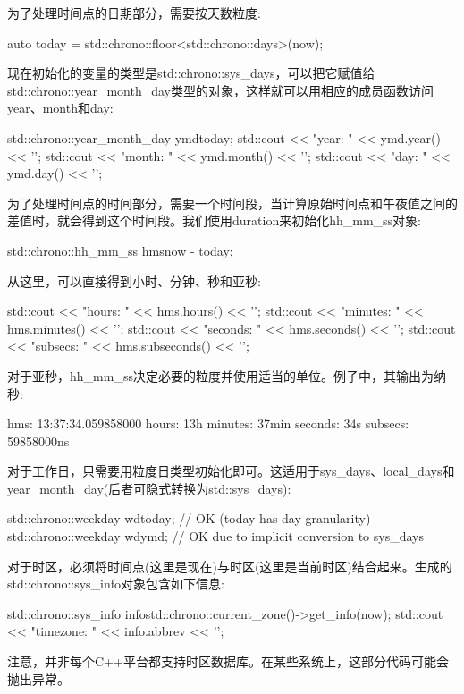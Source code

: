 为了处理时间点的日期部分，需要按天数粒度:

\begin{cpp}
auto today = std::chrono::floor<std::chrono::days>(now);
\end{cpp}

现在初始化的变量的类型是std::chrono::sys\_days，可以把它赋值给std::chrono::year\_month\_day类型的对象，这样就可以用相应的成员函数访问year、month和day:

\begin{cpp}
std::chrono::year_month_day ymd{today};
std::cout << "year: " << ymd.year() << '\n';
std::cout << "month: " << ymd.month() << '\n';
std::cout << "day: " << ymd.day() << '\n';
\end{cpp}

为了处理时间点的时间部分，需要一个时间段，当计算原始时间点和午夜值之间的差值时，就会得到这个时间段。我们使用duration来初始化hh\_mm\_ss对象:

\begin{cpp}
std::chrono::hh_mm_ss hms{now - today};
\end{cpp}

从这里，可以直接得到小时、分钟、秒和亚秒:

\begin{cpp}
std::cout << "hours: " << hms.hours() << '\n';
std::cout << "minutes: " << hms.minutes() << '\n';
std::cout << "seconds: " << hms.seconds() << '\n';
std::cout << "subsecs: " << hms.subseconds() << '\n';
\end{cpp}

对于亚秒，hh\_mm\_ss决定必要的粒度并使用适当的单位。例子中，其输出为纳秒:

\begin{shell}
hms:      13:37:34.059858000
hours:    13h
minutes:  37min
seconds:  34s
subsecs:  59858000ns
\end{shell}

对于工作日，只需要用粒度日类型初始化即可。这适用于sys\_days、local\_days和year\_month\_day(后者可隐式转换为std::sys\_days):

\begin{cpp}
std::chrono::weekday wd{today}; // OK (today has day granularity)
std::chrono::weekday wd{ymd}; // OK due to implicit conversion to sys_days
\end{cpp}

对于时区，必须将时间点(这里是现在)与时区(这里是当前时区)结合起来。生成的std::chrono::sys\_info对象包含如下信息:

\begin{cpp}
std::chrono::sys_info info{std::chrono::current_zone()->get_info(now)};
std::cout << "timezone: " << info.abbrev << '\n';
\end{cpp}

注意，并非每个C++平台都支持时区数据库。在某些系统上，这部分代码可能会抛出异常。




















